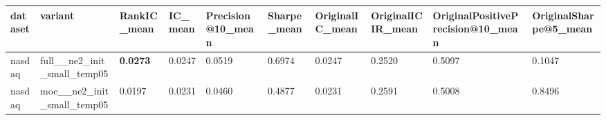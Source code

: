 \begin{tabular}{llllllllll}
dataset & variant & RankIC_mean & IC_mean & Precision@10_mean & Sharpe_mean & OriginalIC_mean & OriginalICIR_mean & OriginalPositivePrecision@10_mean & OriginalSharpe@5_mean \\
\hline
nasdaq & full__ne2_init_small_temp05 & \textbf{0.0273} & 0.0247 & 0.0519 & 0.6974 & 0.0247 & 0.2520 & 0.5097 & 0.1047 \\
nasdaq & moe__ne2_init_small_temp05 & 0.0197 & 0.0231 & 0.0460 & 0.4877 & 0.0231 & 0.2591 & 0.5008 & 0.8496 \\
\end{tabular}
